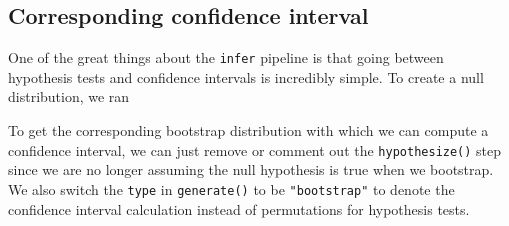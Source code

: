\documentclass[12pt, krantz2,]{krantz}
\makeatletter
\newenvironment{Shaded}{\begin{snugshade}}{\end{snugshade}}
\newcommand{\CommentTok}[1]{\textcolor[rgb]{0.37,0.37,0.37}{\textit{#1}}}
\newcommand{\DataTypeTok}[1]{\textcolor[rgb]{0.27,0.27,0.27}{#1}}
\newcommand{\DecValTok}[1]{\textcolor[rgb]{0.06,0.06,0.06}{#1}}
\newcommand{\KeywordTok}[1]{\textcolor[rgb]{0.27,0.27,0.27}{\textbf{#1}}}
\newcommand{\NormalTok}[1]{#1}
\newcommand{\OperatorTok}[1]{\textcolor[rgb]{0.43,0.43,0.43}{\textbf{#1}}}
\newcommand{\StringTok}[1]{\textcolor[rgb]{0.5,0.5,0.5}{#1}}
\newenvironment{kframe}{%
\medskip{}
\setlength{\fboxsep}{.8em}
 \def\at@end@of@kframe{}%
 \ifinner\ifhmode%
  \def\at@end@of@kframe{\end{minipage}}%
  \begin{minipage}{\columnwidth}%
 \fi\fi%
 \def\FrameCommand##1{\hskip\@totalleftmargin \hskip-\fboxsep
 \colorbox{shadecolor}{##1}\hskip-\fboxsep
     \hskip-\linewidth \hskip-\@totalleftmargin \hskip\columnwidth}%
 \MakeFramed {\advance\hsize-\width
   \@totalleftmargin\z@ \linewidth\hsize
   \@setminipage}}%
 {\par\unskip\endMakeFramed%
 \at@end@of@kframe}
\renewenvironment{Shaded}{\begin{kframe}}{\end{kframe}}
\makeatother
\begin{document}
\hypertarget{corresponding-confidence-interval}{%
\subsection{Corresponding confidence interval}\label{corresponding-confidence-interval}}

One of the great things about the \texttt{infer} pipeline is that going between hypothesis tests and confidence intervals is incredibly simple. To create a null distribution, we ran

\begin{Shaded}
\end{Shaded}

To get the corresponding bootstrap distribution with which we can compute a confidence interval, we can just remove or comment out the \texttt{hypothesize()} step since we are no longer assuming the null hypothesis is true when we bootstrap. We also switch the \texttt{type} in \texttt{generate()} to be \texttt{"bootstrap"} to denote the confidence interval calculation instead of permutations for hypothesis tests.

\begin{Shaded}
\end{Shaded}
\end{document}
